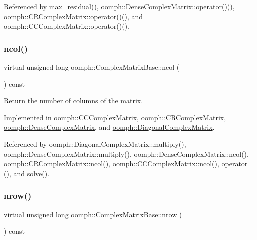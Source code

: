 Referenced by max\+\_\+residual(), oomph\+::\+Dense\+Complex\+Matrix\+::operator()(), oomph\+::\+C\+R\+Complex\+Matrix\+::operator()(), and oomph\+::\+C\+C\+Complex\+Matrix\+::operator()().

\mbox{\label{classoomph_1_1ComplexMatrixBase_a849b63e50dad36ca8b20b7bdefd34b8d}} 
\subsubsection{\texorpdfstring{ncol()}{ncol()}}
{\footnotesize\ttfamily virtual unsigned long oomph\+::\+Complex\+Matrix\+Base\+::ncol (\begin{DoxyParamCaption}{ }\end{DoxyParamCaption}) const\hspace{0.3cm}{\ttfamily [pure virtual]}}



Return the number of columns of the matrix. 



Implemented in \hyperlink{classoomph_1_1CCComplexMatrix_a62540288d116687aa4bd201787845b4d}{oomph\+::\+C\+C\+Complex\+Matrix}, \hyperlink{classoomph_1_1CRComplexMatrix_a4151bc429f2da548cee234e147003bfa}{oomph\+::\+C\+R\+Complex\+Matrix}, \hyperlink{classoomph_1_1DenseComplexMatrix_a4101f581e470c940bf7daf12ec1b234f}{oomph\+::\+Dense\+Complex\+Matrix}, and \hyperlink{classoomph_1_1DiagonalComplexMatrix_ab56dee3ac2b928655382ad6697edd318}{oomph\+::\+Diagonal\+Complex\+Matrix}.



Referenced by oomph\+::\+Diagonal\+Complex\+Matrix\+::multiply(), oomph\+::\+Dense\+Complex\+Matrix\+::multiply(), oomph\+::\+Dense\+Complex\+Matrix\+::ncol(), oomph\+::\+C\+R\+Complex\+Matrix\+::ncol(), oomph\+::\+C\+C\+Complex\+Matrix\+::ncol(), operator=(), and solve().

\mbox{\label{classoomph_1_1ComplexMatrixBase_adcbdf19bc82c61c0a4fbfd8c8de97b3b}} 
\subsubsection{\texorpdfstring{nrow()}{nrow()}}
{\footnotesize\ttfamily virtual unsigned long oomph\+::\+Complex\+Matrix\+Base\+::nrow (\begin{DoxyParamCaption}{ }\end{DoxyParamCaption}) const\hspace{0.3cm}{\ttfamily [pure virtual]}}



